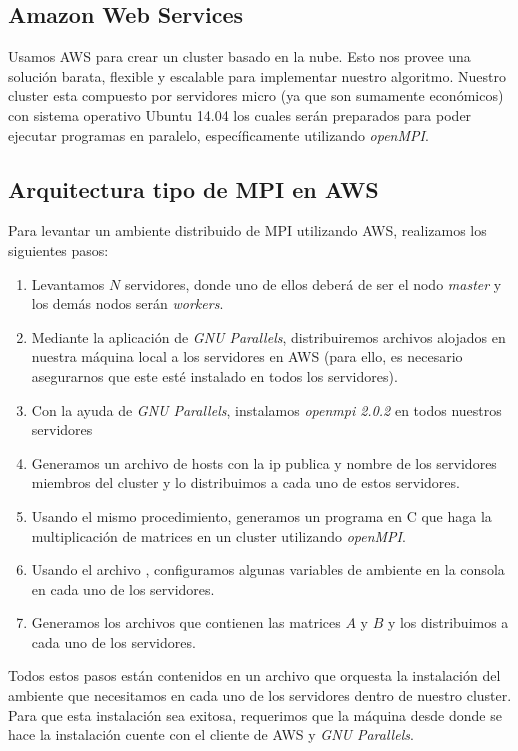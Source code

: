 \documentclass[DIV=calc, paper=letter, fontsize=11pt, twocolumn]{scrartcl}
\begin{document}
\subsection{Amazon Web Services}

Usamos AWS para crear un cluster basado en la nube. Esto nos provee una solución barata, flexible y escalable para implementar nuestro algoritmo. Nuestro cluster esta compuesto por servidores micro (ya que son sumamente económicos) con sistema operativo Ubuntu 14.04 los cuales serán preparados para poder ejecutar programas en paralelo, específicamente utilizando \textit{openMPI}.

\subsection{Arquitectura tipo de MPI en AWS}

Para levantar un ambiente distribuido de MPI utilizando AWS, realizamos los siguientes pasos:

\begin{enumerate}
    \item Levantamos $N$ servidores, donde uno de ellos deberá de ser el nodo \textit{master} y los demás nodos serán \textit{workers}.
    \item Mediante la aplicación de \textit{GNU Parallels}, distribuiremos archivos alojados en nuestra máquina local a los servidores en AWS (para ello, es necesario asegurarnos que este esté instalado en todos los servidores).
    \item Con la ayuda de \textit{GNU Parallels}, instalamos \textit{openmpi 2.0.2} en todos nuestros servidores
    \item Generamos un archivo de hosts con la ip publica y nombre de los servidores miembros del cluster y lo distribuimos a cada uno de estos servidores.
    \item Usando el mismo procedimiento, generamos un programa en C que haga la multiplicación de matrices en un cluster utilizando \textit{openMPI}. 
    \item Usando el archivo , configuramos algunas variables de ambiente en la consola en cada uno de los servidores.
    \item Generamos los archivos que contienen las matrices $A$ y $B$ y los distribuimos a cada uno de los servidores.
\end{enumerate}

Todos estos pasos están contenidos en un archivo que orquesta la instalación del ambiente que necesitamos en cada uno de los servidores dentro de nuestro cluster. Para que esta instalación sea exitosa, requerimos que la máquina desde donde se hace la instalación cuente con el cliente de AWS y \textit{GNU Parallels}.
\end{document}
